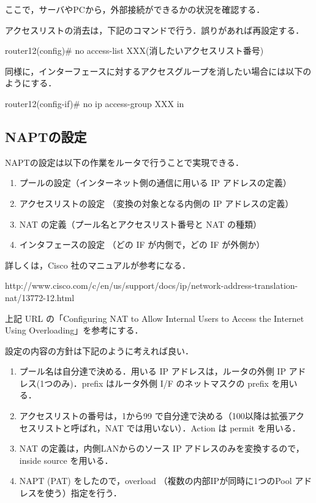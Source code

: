 ここで，サーバやPCから，外部接続ができるかの状況を確認する．

アクセスリストの消去は，下記のコマンドで行う．誤りがあれば再設定する．
\begin{cli}
router12(config)# no access-list XXX(消したいアクセスリスト番号)
\end{cli}

同様に，インターフェースに対するアクセスグループを消したい場合には以下のようにする．
\begin{cli}
router12(config-if)# no ip access-group XXX in
\end{cli}

\clearpage

\subsection{NAPTの設定}

NAPTの設定は以下の作業をルータで行うことで実現できる．

\begin{enumerate}
 \item プールの設定（インターネット側の通信に用いる IP アドレスの定義）
 \item アクセスリストの設定 （変換の対象となる内側の IP アドレスの定義）
 \item NAT の定義（プール名とアクセスリスト番号と NAT の種類）
 \item インタフェースの設定 （どの IF が内側で，どの IF が外側か）
\end{enumerate}

詳しくは，Cisco 社のマニュアルが参考になる．

http://www.cisco.com/c/en/us/support/docs/ip/network-address-translation-nat/13772-12.html

上記 URL の「Configuring NAT to Allow Internal Users to Access the Internet Using Overloading」を参考にする．

設定の内容の方針は下記のように考えれば良い．
\begin{enumerate}
 \item プール名は自分達で決める．用いる IP アドレスは，ルータの外側 IP
       アドレス(1つのみ)．prefix はルータ外側 I/F のネットマスクの
       prefix を用いる．
 \item アクセスリストの番号は，1から99 で自分達で決める（100以降は拡張アク
       セスリストと呼ばれ，NAT では用いない）．Action は permit を用いる．
 \item NAT の定義は，内側LANからのソース IP アドレスのみを変換するので，inside source を用いる．
 \item NAPT (PAT) をしたので，overload （複数の内部IPが同時に1つのPool アドレスを使う）指定を行う．
\end{enumerate}

